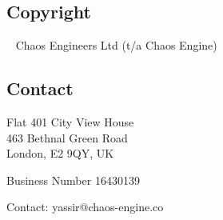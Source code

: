 \documentclass[
	a4paper, %
]{ChaosEngineReport}
\begin{document}

	\subsection*{Copyright}
	
	\textcopyright~\the\year{} Chaos Engineers Ltd (t/a Chaos Engine) 
	
	\subsection*{Contact}
	
	Flat 401 City View House\\
	463 Bethnal Green Road\\
	London, E2 9QY, UK
	
	Business Number 16430139
	
	Contact: yassir@chaos-engine.co
\endgroup
\end{document}
